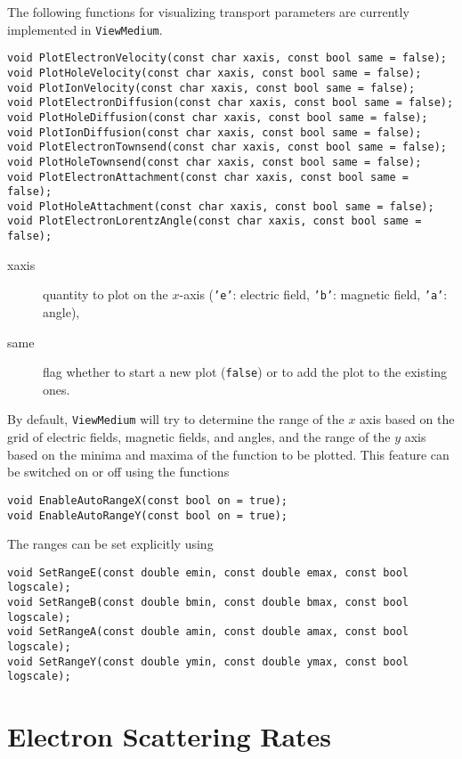 The following functions for visualizing transport parameters 
are currently implemented in \texttt{ViewMedium}.
\begin{lstlisting}
void PlotElectronVelocity(const char xaxis, const bool same = false);
void PlotHoleVelocity(const char xaxis, const bool same = false);
void PlotIonVelocity(const char xaxis, const bool same = false);
void PlotElectronDiffusion(const char xaxis, const bool same = false);
void PlotHoleDiffusion(const char xaxis, const bool same = false);
void PlotIonDiffusion(const char xaxis, const bool same = false);
void PlotElectronTownsend(const char xaxis, const bool same = false);
void PlotHoleTownsend(const char xaxis, const bool same = false);
void PlotElectronAttachment(const char xaxis, const bool same = false);
void PlotHoleAttachment(const char xaxis, const bool same = false);
void PlotElectronLorentzAngle(const char xaxis, const bool same = false);
\end{lstlisting}
\begin{description}
  \item[xaxis] quantity to plot on the $x$-axis (\texttt{'e'}: electric field, 
  \texttt{'b'}: magnetic field, \texttt{'a'}: angle),
  \item[same] flag whether to start a new plot (\texttt{false}) or to add the 
plot to the existing ones.
\end{description}
By default, \texttt{ViewMedium} will try to determine the range of the 
$x$ axis based on the grid of electric fields, magnetic fields, 
and angles, and the range of the $y$ axis based on the 
minima and maxima of the function to be plotted. This feature can be 
switched on or off using the functions
\begin{lstlisting}
void EnableAutoRangeX(const bool on = true);
void EnableAutoRangeY(const bool on = true);
\end{lstlisting}
The ranges can be set explicitly using
\begin{lstlisting}
void SetRangeE(const double emin, const double emax, const bool logscale);
void SetRangeB(const double bmin, const double bmax, const bool logscale);
void SetRangeA(const double amin, const double amax, const bool logscale);
void SetRangeY(const double ymin, const double ymax, const bool logscale);
\end{lstlisting} 
\section{Electron Scattering Rates}

